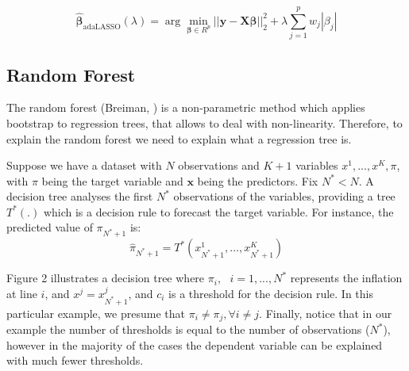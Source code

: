 \documentclass[12pt,openright,twoside,a4paper,brazil,english,emptypage,openany]{abntex2}
\begin{document}
\begin{equation*}
    \bm{\hat{\beta}}_{\text{adaLASSO}}(\lambda) = \arg \min_{\bm{\beta} \in R^p}  ||\bm{y}-\bm{X \beta}||_2^2 + \lambda \sum_{j=1}^p w_j |\beta_j|
\end{equation*}  

\subsection{Random Forest}

\hspace{1em} The random forest (Breiman, \citeyear{breiman2001random}) is a non-parametric method which applies bootstrap to regression trees, that allows to deal with non-linearity. Therefore, to explain the random forest we need to explain what a regression tree is.  

Suppose we have a dataset with $N$ observations and $K+1$ variables $x^1,...,x^K, \pi$, with $\pi$ being the target variable and $\bm{x}$ being the predictors. Fix $N^* < N$. A decision tree analyses the first $N^*$ observations of the variables, providing a tree $T^*(.)$ which is a decision rule to forecast the target variable. For instance, the predicted value of $\pi_{N^*+1}$ is: $$\hat{\pi}_{N^*+1} = T^*(x^1_{N^*+1},\hdots,x^K_{N^*+1})$$



Figure 2 illustrates a decision tree where $\pi_i, \text{ }i=1,...,N^*$ represents the inflation at line $i$, and  $x^j = x^j_{N^*+1}$, and $c_i$ is a threshold for the decision rule. In this particular example, we presume that $\pi_i\neq \pi_j, \forall i \neq j$. Finally, notice that in our example the number of thresholds is equal to the number of observations ($N^*$), however in the majority of the cases the dependent variable can be explained with much fewer thresholds.

\end{document}

